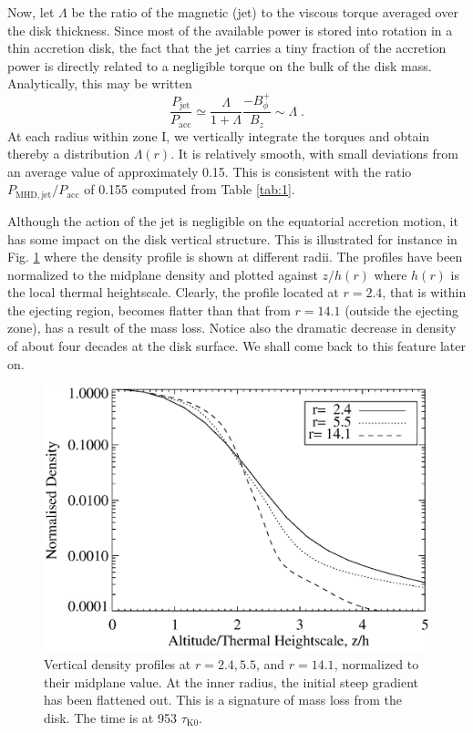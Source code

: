 \documentclass{aa}
\begin{document}
Now, let $\Lambda$ be the ratio of the magnetic (jet) to the viscous torque averaged over the disk thickness. Since most of the available power is stored into rotation in a thin accretion disk, the
fact that the jet carries a tiny fraction of the accretion power is directly related to a negligible torque on the bulk of the disk mass. Analytically, this may be written
\begin{equation}
\frac{P_\mathrm{jet}}{P_\mathrm{acc}} \simeq \frac{\Lambda}{1 + \Lambda} \frac{- B_\phi^+}{B_z} \sim \Lambda \; .
\end{equation}
At each radius within zone I, we vertically integrate the torques and obtain thereby a distribution $\Lambda(r)$. It is relatively smooth, with small deviations from an average value of approximately
0.15. This is consistent with the ratio $P_\mathrm{MHD,jet}/P_\mathrm{acc}$ of 0.155 computed from Table \ref{tab:1}.


Although the action of the jet is negligible on the equatorial accretion motion, it has some impact on the disk vertical structure. This is illustrated for instance in Fig. \ref{denlaunchreg} where
the density profile is shown at different radii. The profiles have been normalized to the midplane density and plotted against $z/h(r)$ where $h(r)$ is the local thermal heightscale. Clearly, the
profile located at $r=2.4$, that is within the ejecting region, becomes flatter than that from $r=14.1$ (outside the ejecting zone), has a result of the mass loss. Notice also the dramatic decrease in
density of about four decades at the disk surface. We shall come back to this feature later on.
   \begin{figure}
   \centering \includegraphics[width=\columnwidth]{12633f06.eps}
   \caption{Vertical density profiles at $r=2.4,5.5$, and $r=14.1$, normalized to their midplane value. At the inner radius, the initial steep gradient has been flattened out. This is a signature of
   mass loss from the disk. The time is at 953 $\tau_\mathrm{K0}$.}
              \label{denlaunchreg}%
    \end{figure}
\end{document}
